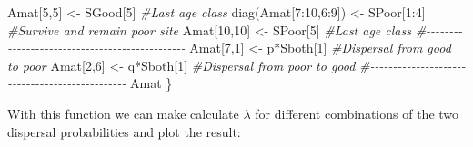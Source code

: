 \documentclass[
]{book}
\newenvironment{Shaded}{\begin{snugshade}}{\end{snugshade}}
\newcommand{\CommentTok}[1]{\textcolor[rgb]{0.56,0.35,0.01}{\textit{#1}}}
\newcommand{\DecValTok}[1]{\textcolor[rgb]{0.00,0.00,0.81}{#1}}
\newcommand{\FunctionTok}[1]{\textcolor[rgb]{0.00,0.00,0.00}{#1}}
\newcommand{\NormalTok}[1]{#1}
\newcommand{\OtherTok}[1]{\textcolor[rgb]{0.56,0.35,0.01}{#1}}
\newcommand{\SpecialCharTok}[1]{\textcolor[rgb]{0.00,0.00,0.00}{#1}}
\begin{document}
\begin{Shaded}
\begin{Highlighting}[]
\NormalTok{  Amat[}\DecValTok{5}\NormalTok{,}\DecValTok{5}\NormalTok{] }\OtherTok{\textless{}{-}}\NormalTok{ SGood[}\DecValTok{5}\NormalTok{] }\CommentTok{\#Last age class}
  \FunctionTok{diag}\NormalTok{(Amat[}\DecValTok{7}\SpecialCharTok{:}\DecValTok{10}\NormalTok{,}\DecValTok{6}\SpecialCharTok{:}\DecValTok{9}\NormalTok{]) }\OtherTok{\textless{}{-}}\NormalTok{ SPoor[}\DecValTok{1}\SpecialCharTok{:}\DecValTok{4}\NormalTok{] }\CommentTok{\#Survive and remain poor site}
\NormalTok{  Amat[}\DecValTok{10}\NormalTok{,}\DecValTok{10}\NormalTok{] }\OtherTok{\textless{}{-}}\NormalTok{ SPoor[}\DecValTok{5}\NormalTok{] }\CommentTok{\#Last age class}
  \CommentTok{\#{-}{-}{-}{-}{-}{-}{-}{-}{-}{-}{-}{-}{-}{-}{-}{-}{-}{-}{-}{-}{-}{-}{-}{-}{-}{-}{-}{-}{-}{-}{-}{-}{-}{-}{-}{-}{-}{-}{-}{-}{-}{-}{-}{-}{-}{-}{-}}
\NormalTok{  Amat[}\DecValTok{7}\NormalTok{,}\DecValTok{1}\NormalTok{] }\OtherTok{\textless{}{-}}\NormalTok{ p}\SpecialCharTok{*}\NormalTok{Sboth[}\DecValTok{1}\NormalTok{] }\CommentTok{\#Dispersal from good to poor}
\NormalTok{  Amat[}\DecValTok{2}\NormalTok{,}\DecValTok{6}\NormalTok{] }\OtherTok{\textless{}{-}}\NormalTok{ q}\SpecialCharTok{*}\NormalTok{Sboth[}\DecValTok{1}\NormalTok{] }\CommentTok{\#Dispersal from poor to good}
  \CommentTok{\#{-}{-}{-}{-}{-}{-}{-}{-}{-}{-}{-}{-}{-}{-}{-}{-}{-}{-}{-}{-}{-}{-}{-}{-}{-}{-}{-}{-}{-}{-}{-}{-}{-}{-}{-}{-}{-}{-}{-}{-}{-}{-}{-}{-}{-}{-}{-}}
\NormalTok{  Amat}
\NormalTok{\}}
\end{Highlighting}
\end{Shaded}

With this function we can make calculate \(\lambda\) for different combinations of the two dispersal probabilities and plot the result:
\end{document}
